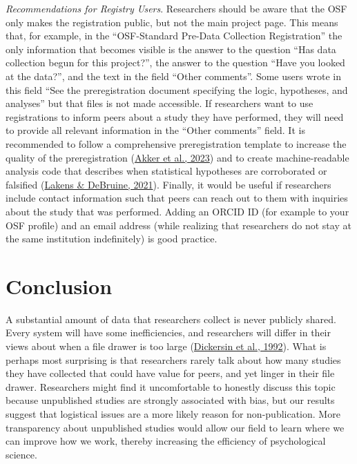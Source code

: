 \documentclass[
  ,jou, a4paper,floatsintext]{apa6}
\begin{document}
\emph{Recommendations for Registry Users}. Researchers should be aware that the OSF only makes the registration public, but not the main project page. This means that, for example, in the ``OSF-Standard Pre-Data Collection Registration'' the only information that becomes visible is the answer to the question ``Has data collection begun for this project?'', the answer to the question ``Have you looked at the data?'', and the text in the field ``Other comments''. Some users wrote in this field ``See the preregistration document specifying the logic, hypotheses, and analyses'' but that files is not made accessible. If researchers want to use registrations to inform peers about a study they have performed, they will need to provide all relevant information in the ``Other comments'' field. It is recommended to follow a comprehensive preregistration template to increase the quality of the preregistration (\protect\hyperlink{ref-akker_effectiveness_2023}{Akker et al., 2023}) and to create machine-readable analysis code that describes when statistical hypotheses are corroborated or falsified (\protect\hyperlink{ref-lakens_improving_2021}{Lakens \& DeBruine, 2021}). Finally, it would be useful if researchers include contact information such that peers can reach out to them with inquiries about the study that was performed. Adding an ORCID ID (for example to your OSF profile) and an email address (while realizing that researchers do not stay at the same institution indefinitely) is good practice.

\hypertarget{conclusion}{%
\section{Conclusion}\label{conclusion}}

A substantial amount of data that researchers collect is never publicly shared. Every system will have some inefficiencies, and researchers will differ in their views about when a file drawer is too large (\protect\hyperlink{ref-dickersin_factors_1992}{Dickersin et al., 1992}). What is perhaps most surprising is that researchers rarely talk about how many studies they have collected that could have value for peers, and yet linger in their file drawer. Researchers might find it uncomfortable to honestly discuss this topic because unpublished studies are strongly associated with bias, but our results suggest that logistical issues are a more likely reason for non-publication. More transparency about unpublished studies would allow our field to learn where we can improve how we work, thereby increasing the efficiency of psychological science.
\end{document}

